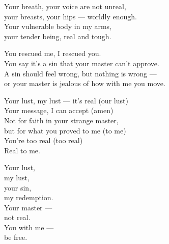 \begin{lyrics}
Your breath, your voice are not unreal,\\
your breasts, your hips — worldly enough.\\
Your vulnerable body in my arms,\\
your tender being, real and tough.

You rescued me, I rescued you.\\
You say it’s a sin that your master can’t approve.\\
A sin should feel wrong, but nothing is wrong —\\
or your master is jealous of how with me you move.

Your lust, my lust — it’s real (our lust)\\
Your message, I can accept (amen)\\
Not for faith in your strange master,\\
but for what you proved to me (to me)\\
You’re too real (too real)\\
Real to me.

Your lust,\\
my lust,\\
your sin,\\
my redemption.\\
Your master —\\
not real.\\
You with me —\\
be free.
\end{lyrics}

